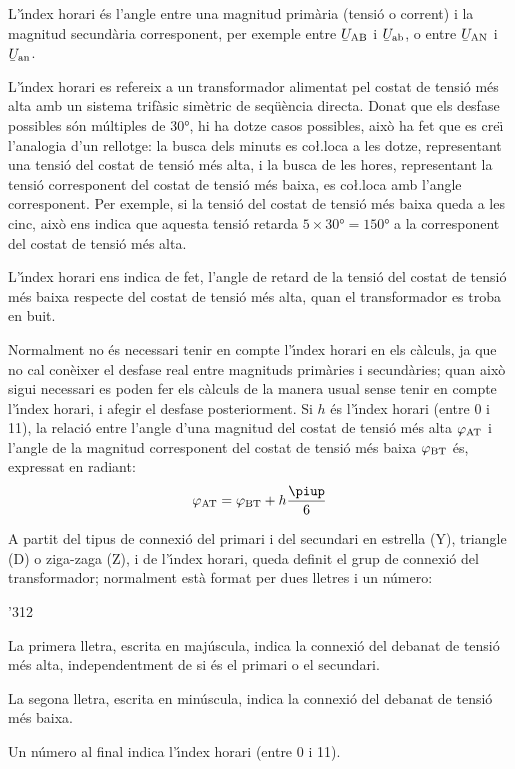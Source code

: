 L'\'{\i}ndex horari \'{e}s l'angle entre una magnitud  prim\`{a}ria (tensi\'{o} o corrent) i la magnitud secund\`{a}ria corresponent, per exemple entre $\cmplx{U}\ped{AB}$ i $\cmplx{U}\ped{ab}$, o entre $\cmplx{U}\ped{AN}$ i $\cmplx{U}\ped{an}$.

L'\'{\i}ndex horari es refereix a un transformador alimentat pel costat de tensi\'{o} m\'{e}s alta  amb un sistema trif\`{a}sic sim\`{e}tric de seq\"{u}\`{e}ncia directa. Donat que els desfase possibles s\'{o}n m\'{u}ltiples de \ang{30}, hi ha dotze casos possibles, aix\`{o} ha fet que es cre\"{\i} l'analogia d'un rellotge: la busca dels minuts es co{\l.l}oca a les dotze, representant una tensi\'{o} del costat de tensi\'{o} m\'{e}s alta, i la busca de les hores, representant la tensi\'{o} corresponent del costat de tensi\'{o} m\'{e}s baixa, es co{\l.l}oca amb l'angle corresponent. Per exemple, si la tensi\'{o} del costat de tensi\'{o} m\'{e}s baixa queda a les cinc, aix\`{o} ens indica que aquesta tensi\'{o} retarda $5\times \ang{30}= \ang{150}$ a la corresponent del costat de tensi\'{o} m\'{e}s alta.

L'\'{\i}ndex horari ens indica de fet, l'angle de retard de la tensi\'{o} del costat de tensi\'{o} m\'{e}s baixa respecte del costat de tensi\'{o} m\'{e}s alta, quan el transformador es troba en buit.

Normalment no \'{e}s necessari tenir en compte l'\'{\i}ndex horari en els c\`{a}lculs, ja que no cal con\`{e}ixer el desfase real entre magnituds prim\`{a}ries i secund\`{a}ries; quan aix\`{o} sigui necessari es poden fer els c\`{a}lculs de la manera usual sense tenir en compte l'\'{\i}ndex horari, i afegir el desfase posteriorment. Si $h$ \'{e}s l'\'{\i}ndex horari (entre 0 i 11), la relaci\'{o} entre l'angle d'una magnitud del costat de tensi\'{o} m\'{e}s alta $\varphi_\mathrm{AT}$ i l'angle de la magnitud corresponent del costat de tensi\'{o} m\'{e}s baixa $\varphi_\mathrm{BT}$ \'{e}s, expressat en radiant:
\begin{equation}
    \varphi\ped{AT} = \varphi\ped{BT} + h\frac{\piup}{6}\label{eq:fi-AT-BT}
\end{equation}


A partit del tipus de connexi\'{o} del primari i del secundari en estrella (Y), triangle (D) o ziga-zaga (Z), i de l'\'{\i}ndex horari, queda definit el grup de connexi\'{o} del transformador; normalment est\`{a} format per dues lletres i un n\'{u}mero:
\begin{dingautolist}{'312}
   \item La primera lletra, escrita en maj\'{u}scula, indica la connexi\'{o} del debanat de tensi\'{o} m\'{e}s alta, independentment de si \'{e}s el primari o el secundari.
   \item La segona lletra, escrita en min\'{u}scula, indica la connexi\'{o} del debanat de tensi\'{o} m\'{e}s baixa.
   \item Un n\'{u}mero al final indica l'\'{\i}ndex horari (entre 0 i 11).
\end{dingautolist}

